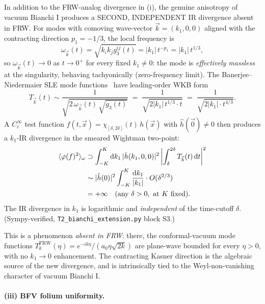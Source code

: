\documentclass[11pt]{article}
\theoremstyle{definition}
\newcommand{\FRW}{\mathrm{FRW}}
\begin{document}
In addition to the FRW-analog divergence in (i), the genuine anisotropy of vacuum Bianchi I produces a SECOND, INDEPENDENT IR divergence absent in FRW. For modes with comoving wave-vector $\vec k=(k_1,0,0)$ aligned with the contracting direction $p_1=-1/3$, the local frequency is
\begin{equation}\label{eq:tachyonic-omega}
\omega_{\vec k}(t) = \sqrt{k_i k_j g_3^{ij}(t)}
   = |k_1|\,t^{-p_1} = |k_1|\,t^{1/3},
\end{equation}
so $\omega_{\vec k}(t)\to 0$ as $t\to 0^+$ for every fixed $k_1\neq 0$: the mode is \emph{effectively massless} at the singularity, behaving tachyonically (zero-frequency limit). The Banerjee--Niedermaier SLE mode functions~\cite[Theorem 4.3]{BanerjeeNiedermaier2023} have leading-order WKB form
\begin{equation}\label{eq:wkb-mode}
T_{\vec k}(t) \sim \frac{1}{\sqrt{2\,\omega_{\vec k}(t)\,\sqrt{g_3(t)}}}
  \;=\; \frac{1}{\sqrt{2|k_1|\,t^{1/3}\cdot t}}
   \;=\; \frac{1}{\sqrt{2|k_1|\cdot t^{4/3}}}.
\end{equation}
A $C_c^\infty$ test function $f(t,\vec x) = \chi_{[\delta,2\delta]}(t)\,h(\vec x)$ with $\hat h(\vec 0)\neq 0$ then produces a $k_1$-IR divergence in the smeared Wightman two-point:
\begin{align}
\langle\varphi(f)^2\rangle_\omega
  &\supset
  \int_{-K}^K \mathrm{d}k_1\,|\hat h(k_1,0,0)|^2\,
   \biggl|\int_\delta^{2\delta}T_{\vec k}(t)\,\mathrm{d}t\biggr|^2
  \notag\\
  &\sim |\hat h(0)|^2 \int_{-K}^K \frac{\mathrm{d}k_1}{|k_1|}\cdot O(\delta^{2/3})
  \notag\\
  &= +\infty\quad(\text{any }\delta>0,\text{ at }K\text{ fixed}).
  \label{eq:k-IR}
\end{align}
The IR divergence in $k_1$ is logarithmic and \emph{independent} of the time-cutoff $\delta$. (Sympy-verified, \texttt{T2\_bianchi\_extension.py} block S3.)

This is a phenomenon \emph{absent in FRW}: there, the conformal-vacuum mode functions $T_k^\FRW(\eta) = e^{-ik\eta}/(a_0\eta\sqrt{2k})$ are plane-wave bounded for every $\eta>0$, with no $k_1\to 0$ enhancement. The contracting Kasner direction is the algebraic source of the new divergence, and is intrinsically tied to the Weyl-non-vanishing character of vacuum Bianchi I.

\paragraph{(iii) BFV folium uniformity.}
\end{document}
